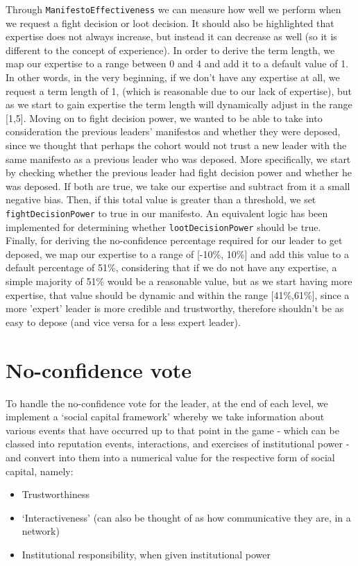 Through \verb|ManifestoEffectiveness| we can measure how well we perform when we request a fight decision or loot decision. It should also be highlighted that expertise does not always increase, but instead it can decrease as well (so it is different to the concept of experience). In order to derive the term length, we map our expertise to a range between 0 and 4 and add it to a default value of 1. In other words, in the very beginning, if we don't have any expertise at all, we request a term length of 1, (which is reasonable due to our lack of expertise), but as we start to gain expertise the term length will dynamically adjust in the range [1,5]. Moving on to fight decision power, we wanted to be able to take into consideration the previous leaders' manifestos and whether they were deposed, since we thought that perhaps the cohort would not trust a new leader with the same manifesto as a previous leader who was deposed. More specifically, we start by checking whether the previous leader had fight decision power and whether he was deposed. If both are true, we take our expertise and subtract from it a small negative bias. Then, if this total value is greater than a threshold, we set \verb|fightDecisionPower| to true in our manifesto. An equivalent logic has been implemented for determining whether \verb|lootDecisionPower| should be true. Finally, for deriving the no-confidence percentage required for our leader to get deposed, we map our expertise to a range of [-10\%, 10\%] and add this value to a default percentage of 51\%, considering that if we do not have any expertise, a simple majority of 51\% would be a reasonable value, but as we start having more expertise, that value should be dynamic and within the range [41\%,61\%], since a more 'expert' leader is more credible and trustworthy, therefore shouldn't be as easy to depose (and vice versa for a less expert leader).

\section{No-confidence vote}
To handle the no-confidence vote for the leader, at the end of each level, we implement a `social capital framework' whereby we take information about various events that have occurred up to that point in the game - which can be classed into reputation events, interactions, and exercises of institutional power - and convert  into them into a numerical value for the respective form of social capital, namely: 
\begin{itemize} 
\item{Trustworthiness}
\item{`Interactiveness' (can also be thought of as how communicative they are, in a network)} \item{Institutional responsibility, when given institutional power}
\end{itemize}

